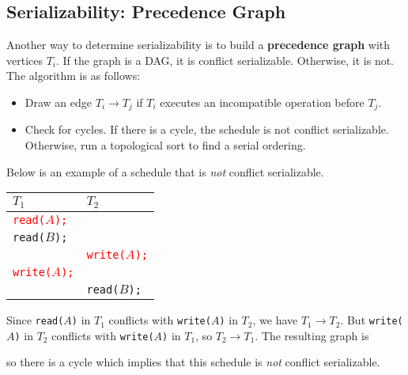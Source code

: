 \documentclass{report}
\newenvironment{example}{\begin{tcolorbox}[title={Example},colback=green!5!white,colframe=black!75!green]}{\end{tcolorbox}}
\renewcommand{\bf}[1]{\textbf{{#1}}}
\renewcommand{\tt}[1]{\texttt{{#1}}}
\renewcommand{\it}[1]{\textit{{#1}}}
\begin{document}
\subsection{Serializability: Precedence Graph}
Another way to determine serializability is to build a \bf{precedence graph}
with vertices $T_i$. If the graph is a DAG, it is conflict serializable.
Otherwise, it is not. The algorithm is as follows:
\begin{itemize}[label=$\to$]
    \item Draw an edge $T_i \to T_j$ if $T_i$ executes an incompatible operation
        before $T_j$.
    \item Check for cycles. If there is a cycle, the schedule is not conflict
        serializable. Otherwise, run a topological sort to find a serial
        ordering.
\end{itemize}

\begin{example}
    Below is an example of a schedule that is \it{not} conflict serializable.

    {
        \centering
        \begin{tabular}{l|l}
            $T_1$ & $T_2$ \\
            \hline
            \tt{\textcolor{red}{read($A$);}} & \\
            \tt{read($B$);} & \\
                            & \tt{\textcolor{red}{write($A$);}} \\
            \tt{\textcolor{red}{write($A$);}} & \\
                             & \tt{read($B$);} \\
        \end{tabular}
        \par
    }

    Since \tt{read($A$)} in $T_1$ conflicts with \tt{write($A$)} in $T_2$, we
    have $T_1 \to T_2$. But \tt{write($A$)} in $T_2$ conflicts with
    \tt{write($A$)} in $T_1$, so $T_2 \to T_1$. The resulting graph is

    {
        \centering
        \par
    }

    so there is a cycle which implies that this schedule is \it{not} conflict
    serializable.
\end{example}
\end{document}
